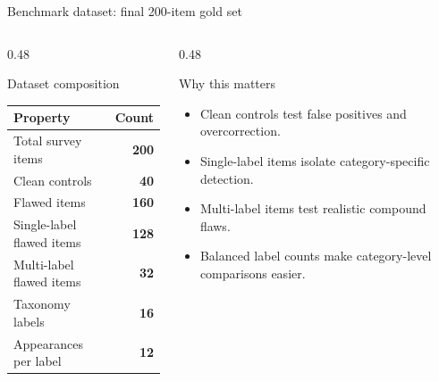 \documentclass[aspectratio=169,10pt]{beamer}
\newcommand{\tight}{\setlength{\itemsep}{2pt}\setlength{\parskip}{0pt}}
\begin{document}
\begin{frame}{Benchmark dataset: final 200-item gold set}
\begin{columns}[T,onlytextwidth]
\begin{column}{0.48\textwidth}
\begin{block}{Dataset composition}
\centering
\small
\begin{tabular}{lr}
\toprule
Property & Count\\
\midrule
Total survey items & \textbf{200}\\
Clean controls & \textbf{40}\\
Flawed items & \textbf{160}\\
Single-label flawed items & \textbf{128}\\
Multi-label flawed items & \textbf{32}\\
Taxonomy labels & \textbf{16}\\
Appearances per label & \textbf{12}\\
\bottomrule
\end{tabular}
\end{block}
\end{column}

\begin{column}{0.48\textwidth}
\begin{block}{Why this matters}
\begin{itemize}\tight
  \item Clean controls test false positives and overcorrection.
  \item Single-label items isolate category-specific detection.
  \item Multi-label items test realistic compound flaws.
  \item Balanced label counts make category-level comparisons easier.
\end{itemize}
\end{block}

\vspace{2mm}

\end{column}
\end{columns}
\end{frame}
\end{document}
